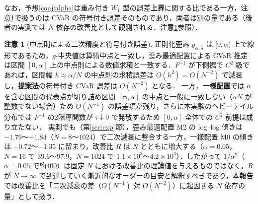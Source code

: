 \documentclass[a4paper,10pt]{jsarticle}
\theoremstyle{definition}
\newtheorem{remark}{注意}[section]
\newcommand{\Wone}{W_1}
\newcommand{\Finv}{F^{-1}}
\begin{document}
なお，予想\ref{conj:alpha}は重み付き $\Wone$ 型の誤差\textbf{上界}に関する比である一方，注意\ref{rem:midpoint}で扱うのは CVaR の符号付き誤差そのものであり，両者は別の量である（後者の実測では $N$ 依存の改善比として観測される．注意\ref{rem:midpoint}参照）．
\begin{remark}[中点則による二次精度と符号付き誤差]
\label{rem:midpoint}
正則化歪み $g_{\alpha,\lambda}$ は $[0,\alpha)$ 上で線形であるため，$g$-中央値は算術中点と一致し，歪み最適配置による CVaR 推定は区間 $[0,\alpha]$ 上の中点則による数値求積と一致する．$\Finv$ が下側裾で $C^2$ 級であれば，区間幅 $h\approx\alpha/N$ の中点則の求積誤差は $O(h^2)=O(N^{-2})$ で減衰し，\textbf{提案法}の符号付き CVaR 誤差は $O(N^{-2})$ となる．
一方，\textbf{一様配置}では $\alpha$ を含む区間の代表点が切り詰め区間 $[\tau_i,\alpha]$ の中点と一般に一致しない（$\alpha N$ が整数でない場合）ため $O(N^{-1})$ の誤差項が残り，さらに本実験のヘビーテイル分布では $\Finv$ の2階導関数が $\tau\downarrow0$ で発散するため $[0,\alpha]$ 全体での $C^2$ 前提は成り立たない．
実測でも（第\ref{sec:exp}節），歪み最適配置 M2 の log--log 傾きは $-1.79$〜$-1.84$（$N=8$〜$1024$）で二次減衰に整合する一方，一様配置 M0 の傾きは $-0.72$〜$-1.35$ に留まり，改善比 $R$ は $N$ とともに増大する（$\alpha=0.05$，$N=16$ で $39.6$〜$97.9$，$N=1024$ で $1.1\times10^3$〜$4.2\times10^3$）．したがって $1/\alpha^2$（$\alpha=0.05$ で約400）は固定 $N$ における改善比の理論値を与えるものではなく，$R$ が $N\to\infty$ で到達していく漸近的なオーダーの目安と解釈すべきであり，本報告では改善比を「二次減衰の差（$O(N^{-1})$ 対 $O(N^{-2})$）に起因する $N$ 依存の量」として扱う．
\end{remark}
\end{document}
